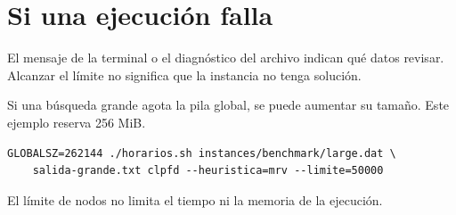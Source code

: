 \documentclass[11pt,a4paper]{article}
\begin{document}
\section{Si una ejecución falla}

El mensaje de la terminal o el diagnóstico del archivo indican qué datos revisar. Alcanzar el límite no significa que la instancia no tenga solución.

Si una búsqueda grande agota la pila global, se puede aumentar su tamaño. Este ejemplo reserva 256 MiB.

\begin{lstlisting}
GLOBALSZ=262144 ./horarios.sh instances/benchmark/large.dat \
    salida-grande.txt clpfd --heuristica=mrv --limite=50000
\end{lstlisting}

El límite de nodos no limita el tiempo ni la memoria de la ejecución.
\end{document}
